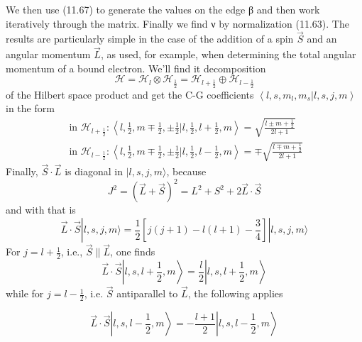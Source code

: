 We then use (11.67) to generate the values ​​on the edge β and then work iteratively through the matrix. Finally we find ν by normalization (11.63).
The results are particularly simple in the case of the addition of a spin $\vec{S}$ and an angular momentum $\vec{L}$, as used, for example, when determining the total angular momentum of a bound electron. We'll find it
decomposition
\begin{equation}
    \mathcal{H}=\mathcal{H}_{l} \otimes \mathcal{H}_{\frac{1}{2}}=\mathcal{H}_{l+\frac{1}{2}} \oplus \mathcal{H}_{l-\frac{1}{2}}
    \end{equation}
of the Hilbert space product and get the C-G coefficients
$\left\langle l, s, m_{l}, m_{s} | l, s, j, m\right\rangle$ in the form
\begin{equation}
\begin{array}{l}{\text { in } \mathcal{H}_{l+\frac{1}{2}}:\left\langle l, \frac{1}{2}, m \mp \frac{1}{2}, \pm \frac{1}{2} | l, \frac{1}{2}, l+\frac{1}{2}, m\right\rangle=\sqrt{\frac{l \pm m+\frac{1}{2}}{2 l+1}}} \\ {\text { in } \mathcal{H}_{l-\frac{1}{2}}:\left\langle l, \frac{1}{2}, m \mp \frac{1}{2}, \pm \frac{1}{2} | l, \frac{1}{2}, l-\frac{1}{2}, m\right\rangle=\mp \sqrt{\frac{l \mp m+\frac{1}{2}}{2 l+1}}}\end{array}
\end{equation}
Finally, $\vec{S} \cdot \vec{L}$ is diagonal in $|l, s, j, m\rangle$, because
\begin{equation}
    J^{2}=(\vec{L}+\vec{S})^{2}=L^{2}+S^{2}+2 \vec{L} \cdot \vec{S}
    \end{equation}
and with that is
\begin{equation}
    \vec{L} \cdot \vec{S}|l, s, j, m\rangle=\frac{1}{2}\left[j(j+1)-l(l+1)-\frac{3}{4}\right]|l, s, j, m\rangle
    \end{equation}
For $j = l + \frac{1}{2}$, i.e., $\vec{S} \| \vec{L}$, one finds
\begin{equation}
    \vec{L} \cdot \vec{S}\left|l, s, l+\frac{1}{2}, m\right\rangle=\frac{l}{2}\left|l, s, l+\frac{1}{2}, m\right\rangle
    \end{equation}
while for $j = l -\frac{1}{2}$, i.e. $\vec{S}$ antiparallel to $\vec{L}$, the following applies

\begin{equation}
    \vec{L} \cdot \vec{S}\left|l, s, l-\frac{1}{2}, m\right\rangle=-\frac{l+1}{2}\left|l, s, l-\frac{1}{2}, m\right\rangle
    \end{equation}
